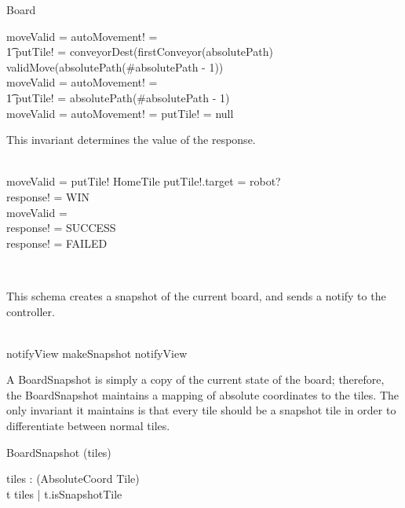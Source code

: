 \begin{class}{Board}
\begin{notopschema}
\THEN moveValid = \true \wedge autoMovement! = \true \;\; \wedge \\ \t1 putTile! = conveyorDest(firstConveyor(absolutePath) \\
\ELSE \IF validMove(absolutePath(\#absolutePath - 1)) \\
\THEN moveValid = \true \wedge autoMovement! = \false \; \; \wedge \\ \t1  putTile! = absolutePath(\#absolutePath - 1) \\
\ELSE moveValid = \false \wedge autoMovement! = \false \wedge putTile! = null \\
\also \also \also
\begin{zpar}
This invariant determines the value of the response.
\end{zpar} \\
\IF moveValid = \true \wedge putTile! \in HomeTile \wedge putTile!.target = robot? \\
\THEN response! = WIN \\
\ELSE \IF moveValid = \true \\
\THEN response! = SUCCESS \\
\ELSE response! = FAILED
\end{notopschema} \\
\begin{zpar}
This schema creates a snapshot of the current board, and sends a notify to the controller.
\end{zpar} \\
notifyView \sdef makeSnapshot \comp notifyView
\end{class}

A BoardSnapshot is simply a copy of the current state of the board; therefore, the BoardSnapshot maintains a mapping of absolute coordinates to the tiles. The only invariant it maintains is that every tile should be a snapshot tile in order to differentiate between normal tiles.
\begin{class}{BoardSnapshot}
\upharpoonright (tiles) \\
\begin{state}
tiles : \power (AbsoluteCoord \fun Tile) \\
\where
\forall t \ran tiles | t.isSnapshotTile
\end{state}
\end{class}

